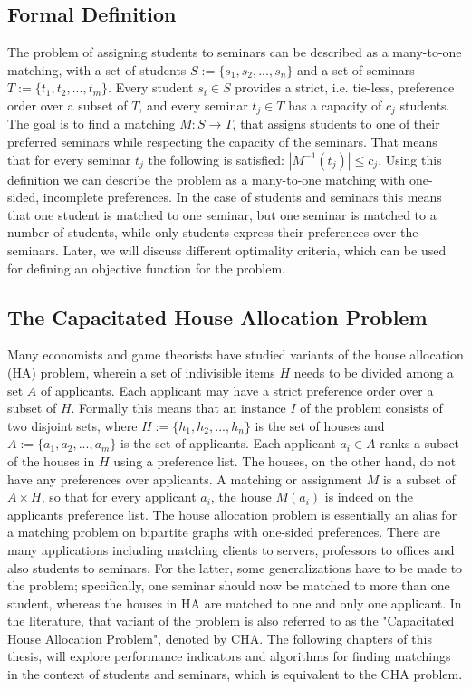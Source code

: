 \subsection{Formal Definition}
The problem of assigning students to seminars can be described as a many-to-one matching, with a set of students $S:= \{s_1, s_2, ...,s_n\}$ and a set of seminars $T:= \{t_1, t_2, ..., t_m\}$. Every student $s_i \in S$ provides a strict, i.e. tie-less, preference order over a subset of $T$, and every seminar $t_j \in T$ has a capacity of $c_j$ students. The goal is to find a matching $M: S \rightarrow T$, that assigns students to one of their preferred seminars while respecting the capacity of the seminars. That means that for every seminar $t_j$ the following is satisfied: $|M^{-1}(t_j)| \leq c_j$. Using this definition we can describe the problem as a many-to-one matching with one-sided, incomplete preferences. In the case of students and seminars this means that one student is matched to one seminar, but one seminar is matched to a number of students, while only students express their preferences over the seminars. Later, we will discuss different optimality criteria, which can be used for defining an objective function for the problem.

\subsection{The Capacitated House Allocation Problem}\label{intro:cha}
Many economists and game theorists\cite{FEKETE2003219} have studied variants of the house allocation (HA) problem, wherein a set of indivisible items $H$ needs to be divided among a set $A$ of applicants. Each applicant may have a strict preference order over a subset of $H$. Formally this means that an instance $I$ of the problem consists of two disjoint sets, where $H := \{h_1, h_2, ..., h_n\}$ is the set of houses and $A := \{a_1, a_2, ..., a_m\}$ is the set of applicants. Each applicant $a_i \in A$ ranks a subset of the houses in $H$ using a preference list. The houses, on the other hand, do not have any preferences over applicants. A matching or assignment $M$ is a subset of $A \times H$, so that for every applicant $a_i$, the house $M(a_i)$ is indeed on the applicants preference list.\cite{SngThesis} 
\newline
The house allocation problem is essentially an alias for a matching problem on bipartite graphs with one-sided preferences. There are many applications including matching clients to servers, professors to offices and also students to seminars. For the latter, some generalizations have to be made to the problem; specifically, one seminar should now be matched to more than one student, whereas the houses in HA are matched to one and only one applicant. In the literature, that variant of the problem is also referred to as the "Capacitated House Allocation Problem", denoted by CHA.\cite{algorithmics} The following chapters of this thesis, will explore performance indicators and algorithms for finding matchings in the context of students and seminars, which is equivalent to the CHA problem.

